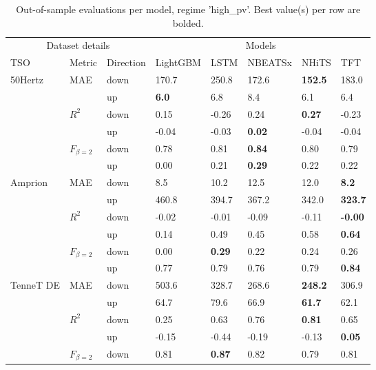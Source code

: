 \begin{table}
\caption{Out-of-sample evaluations per model, regime 'high_pv'. Best value(s) per row are bolded.}
\begin{tabular}{llllllll}
\toprule
\multicolumn{3}{c}{Dataset details} & \multicolumn{5}{c}{Models} \\
\cmidrule(lr){1-3}\cmidrule(lr){4-8}
TSO & Metric & Direction & LightGBM & LSTM & NBEATSx & NHiTS & TFT \\
\midrule
\multirow[t]{6}{*}{50Hertz} & \multirow[t]{2}{*}{MAE} & down & 170.7 & 250.8 & 172.6 & \textbf{152.5} & 183.0 \\
 &  & up & \textbf{6.0} & 6.8 & 8.4 & 6.1 & 6.4 \\
\cline{2-8}
 & \multirow[t]{2}{*}{$R^2$} & down & 0.15 & -0.26 & 0.24 & \textbf{0.27} & -0.23 \\
 &  & up & -0.04 & -0.03 & \textbf{0.02} & -0.04 & -0.04 \\
\cline{2-8}
 & \multirow[t]{2}{*}{$F_{\beta=2}$} & down & 0.78 & 0.81 & \textbf{0.84} & 0.80 & 0.79 \\
 &  & up & 0.00 & 0.21 & \textbf{0.29} & 0.22 & 0.22 \\
\cline{1-8} \cline{2-8}
\multirow[t]{6}{*}{Amprion} & \multirow[t]{2}{*}{MAE} & down & 8.5 & 10.2 & 12.5 & 12.0 & \textbf{8.2} \\
 &  & up & 460.8 & 394.7 & 367.2 & 342.0 & \textbf{323.7} \\
\cline{2-8}
 & \multirow[t]{2}{*}{$R^2$} & down & -0.02 & -0.01 & -0.09 & -0.11 & \textbf{-0.00} \\
 &  & up & 0.14 & 0.49 & 0.45 & 0.58 & \textbf{0.64} \\
\cline{2-8}
 & \multirow[t]{2}{*}{$F_{\beta=2}$} & down & 0.00 & \textbf{0.29} & 0.22 & 0.24 & 0.26 \\
 &  & up & 0.77 & 0.79 & 0.76 & 0.79 & \textbf{0.84} \\
\cline{1-8} \cline{2-8}
\multirow[t]{6}{*}{TenneT DE} & \multirow[t]{2}{*}{MAE} & down & 503.6 & 328.7 & 268.6 & \textbf{248.2} & 306.9 \\
 &  & up & 64.7 & 79.6 & 66.9 & \textbf{61.7} & 62.1 \\
\cline{2-8}
 & \multirow[t]{2}{*}{$R^2$} & down & 0.25 & 0.63 & 0.76 & \textbf{0.81} & 0.65 \\
 &  & up & -0.15 & -0.44 & -0.19 & -0.13 & \textbf{0.05} \\
\cline{2-8}
 & \multirow[t]{2}{*}{$F_{\beta=2}$} & down & 0.81 & \textbf{0.87} & 0.82 & 0.79 & 0.81 \\

\end{tabular}
\end{table}
